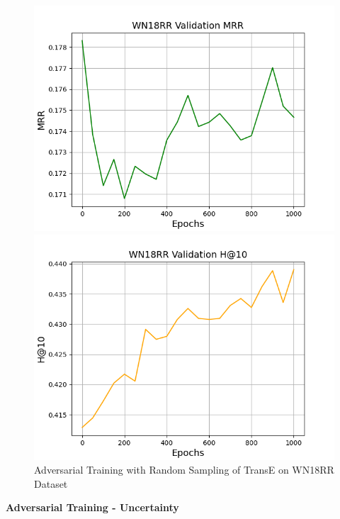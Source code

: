 \begin{figure}
\begin{minipage}{.5\textwidth}
    \end{minipage}
    \begin{minipage}{.5\textwidth}
      \centering
      \includegraphics[width=0.9\linewidth]{figures/results/WN18RR/AdversarialTraining/Random/gan_train_wn18rr_mrr.png}
   \end{minipage}%
    \begin{minipage}{.5\textwidth}
      \centering
      \includegraphics[width=0.9\linewidth]{figures/results/WN18RR/AdversarialTraining/Random/gan_train_wn18rr_hit10.png}
    \end{minipage}%
    \caption{Adversarial Training with Random Sampling of TransE on WN18RR Dataset}
    \label{fig:test}
\end{figure}

\pagebreak

\textbf{Adversarial Training - Uncertainty}\\